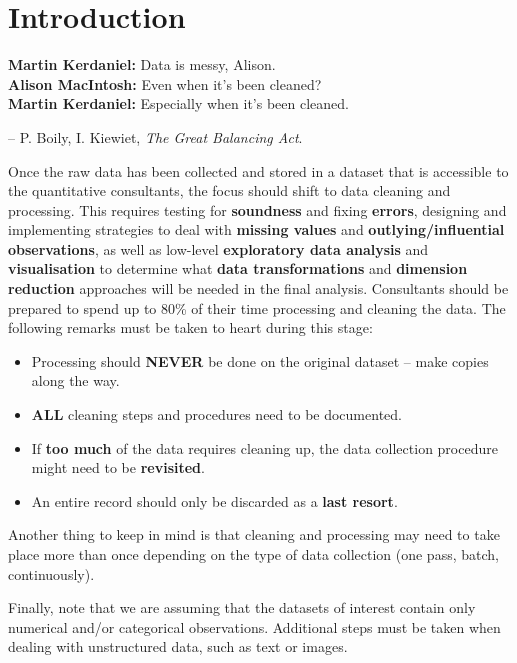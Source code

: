 \section{Introduction}\label{sec:DP}
\begin{tcolorbox}[title=Data Validation]
\textbf{Martin Kerdaniel:} Data is messy, Alison.  \\ 
\textbf{Alison MacIntosh:} Even when it's been cleaned?  \\ 
\textbf{Martin Kerdaniel:} Especially when it's been cleaned.\\[-0.6cm]
\begin{flushright}
-- P. Boily, I. Kiewiet, \textit{The Great Balancing Act}.
\end{flushright}
\end{tcolorbox}
\noindent
Once the raw data has been collected and stored in a dataset that is accessible to the quantitative consultants, the focus should shift to data cleaning and processing.  This requires testing for \textbf{soundness} and fixing \textbf{errors}, designing and implementing strategies to deal with \textbf{missing values} and \textbf{outlying/influential observations}, as well as low-level \textbf{exploratory data analysis} and \textbf{visualisation} to determine what \textbf{data transformations} and \textbf{dimension reduction} approaches will be needed in the final analysis. Consultants should be prepared to spend up to 80\% of their time processing and cleaning the data.  
\newl 
The following remarks must be taken to heart during this stage: 
\begin{itemize}[noitemsep]
\item Processing should \textbf{NEVER} be done on the original dataset -- make copies along the way.
\item {\textbf{ALL}} cleaning steps and procedures need to be documented.
\item If \textbf{too much} of the data requires cleaning up, the data collection procedure might need to be \textbf{revisited}.
\item An entire record should only be discarded as a \textbf{last resort}.
\end{itemize}
Another thing to keep in mind is that cleaning and processing may need to take place more than once depending on the type of data collection (one pass, batch, continuously). \par Finally, note that we are assuming that the datasets of interest contain only numerical and/or categorical observations. Additional steps must be taken when dealing with unstructured data, such as text or images.  

